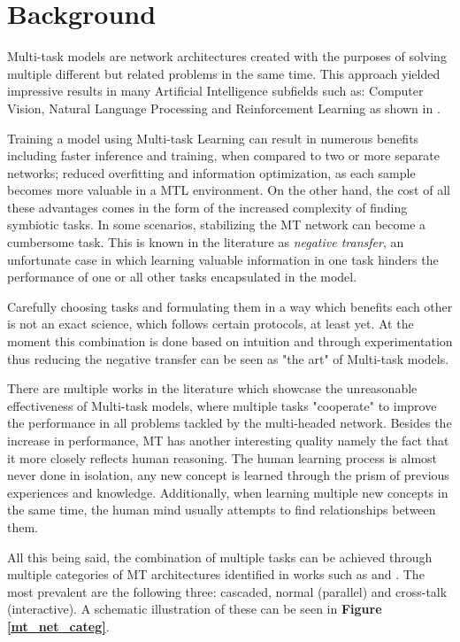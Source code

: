 \chapter{Background}
\label{chapter:RelatedWork}

Multi-task models are network architectures created with the purposes of solving multiple different but related problems in the same time. This approach yielded impressive results in many Artificial Intelligence subfields such as: Computer Vision, Natural Language Processing and Reinforcement Learning as shown in \cite{crawshaw2020multi}.

Training a model using Multi-task Learning can result in numerous benefits including faster inference and training, when compared to two or more separate networks; reduced overfitting and information optimization, as each sample becomes more valuable in a MTL environment. On the other hand, the cost of all these advantages comes in the form of the increased complexity of finding symbiotic tasks. In some scenarios, stabilizing the MT network can become a cumbersome task. This is known in the literature as \textit{negative transfer}, an unfortunate case in which learning valuable information in one task hinders the performance of one or all other tasks encapsulated in the model.

Carefully choosing tasks and formulating them in a way which benefits each other is not an exact science, which follows certain protocols, at least yet. At the moment this combination is done based on intuition and through experimentation thus reducing the negative transfer can be seen as "the art" of Multi-task models. 

There are multiple works in the literature which showcase the unreasonable effectiveness of Multi-task models, where multiple tasks "cooperate" to improve the performance in all problems tackled by the multi-headed network. Besides the increase in performance, MT has another interesting quality namely the fact that it more closely reflects human reasoning. The human learning process is almost never done in isolation, any new concept is learned through the prism of previous experiences and knowledge. Additionally, when learning multiple new concepts in the same time, the human mind usually attempts to find relationships between them. 

All this being said, the combination of multiple tasks can be achieved through multiple categories of MT architectures identified in works such as \cite{crawshaw2020multi} and \cite{zhao2023multi}. The most prevalent are the following three: cascaded, normal (parallel) and cross-talk (interactive). A schematic illustration of these can be seen in \textbf{Figure \ref{mt_net_categ}}.

